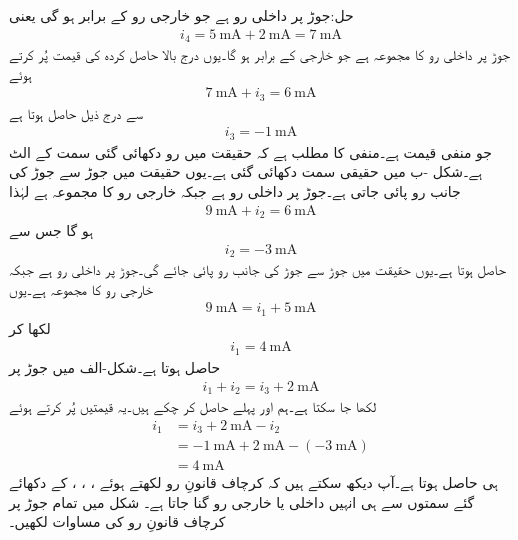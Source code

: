حل:جوڑ  پر داخلی رو  ہے جو خارجی رو  کے برابر ہو گی یعنی
\begin{align*}
i_4=\SI{5}{\milli\ampere}+\SI{2}{\milli\ampere}=\SI{7}{\milli\ampere}
\end{align*}
جوڑ  پر داخلی رو کا مجموعہ  ہے جو خارجی  کے برابر ہو گا۔یوں درج بالا حاصل کردہ  کی قیمت پُر کرتے ہوئے
\begin{align*}
\SI{7}{\milli\ampere}+i_3=\SI{6}{\milli\ampere}
\end{align*}
سے درج ذیل حاصل ہوتا ہے
\begin{align*}
i_3=\SI{-1}{\milli\ampere}
\end{align*}
جو منفی قیمت ہے۔منفی  کا مطلب ہے کہ حقیقت میں رو دکھائی گئی سمت کے الٹ ہے۔شکل -ب میں حقیقی سمت دکھائی گئی ہے۔یوں حقیقت میں جوڑ  سے جوڑ  کی جانب  رو پائی جاتی ہے۔جوڑ  پر داخلی رو  ہے جبکہ خارجی رو کا مجموعہ  ہے لہٰذا
\begin{align*}
\SI{9}{\milli\ampere}+i_2=\SI{6}{\milli\ampere}
\end{align*}
ہو گا جس سے
\begin{align*}
i_2=\SI{-3}{\milli\ampere}
\end{align*}
حاصل ہوتا ہے۔یوں حقیقت میں جوڑ  سے جوڑ  کی جانب  رو پائی جائے گی۔جوڑ  پر داخلی رو   ہے جبکہ خارجی رو کا مجموعہ  ہے۔یوں
\begin{align*}
\SI{9}{\milli\ampere}=i_1+\SI{5}{\milli\ampere}
\end{align*}
لکھا کر
\begin{align*}
i_1=\SI{4}{\milli\ampere}
\end{align*}
حاصل ہوتا ہے۔شکل-الف میں جوڑ  پر 
\begin{align*}
i_1+i_2=i_3+\SI{2}{\milli\ampere}
\end{align*}
لکھا جا سکتا ہے۔ہم  اور  پہلے حاصل کر چکے ہیں۔یہ قیمتیں پُر کرتے ہوئے
\begin{align*}
i_1&=i_3+\SI{2}{\milli\ampere}-i_2 \\
&=\SI{-1}{\milli\ampere}+\SI{2}{\milli\ampere}-(\SI{-3}{\milli\ampere}) \\
&=\SI{4}{\milli\ampere}
\end{align*}
ہی حاصل ہوتا ہے۔آپ دیکھ سکتے ہیں کہ کرچاف قانونِ رو لکھتے ہوئے ،  ، ،  کے دکھائے گئے سمتوں سے ہی انہیں داخلی یا خارجی رو گنا جاتا ہے۔
\FloatBarrier
شکل  میں تمام جوڑ پر کرچاف قانونِ رو کی مساوات لکھیں۔

